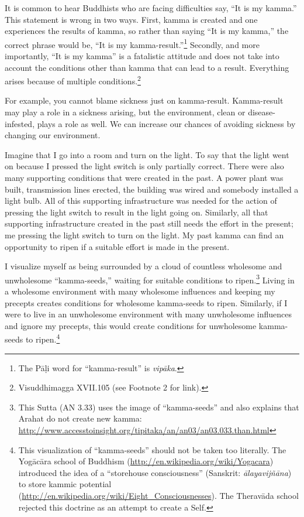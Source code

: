 It is common to hear Buddhists who are facing difficulties say, “It is my kamma.” This statement is wrong in two ways. First, kamma is created and one experiences the results of kamma, so rather than saying “It is my kamma,” the correct phrase would be, “It is my kamma-result.”\footnote{The Pāḷi word for “kamma-result” is \textit{vipāka}.} Secondly, and more importantly, “It is my kamma” is a fatalistic attitude and does not take into account the conditions other than kamma that can lead to a result. Everything arises because of multiple conditions.\footnote{Visuddhimagga XVII.105 (see Footnote 2 for link).} 

\pagebreak

For example, you cannot blame sickness just on kamma-result. Kamma-result may play a role in a sickness arising, but the environment, clean or disease-infested, plays a role as well. We can increase our chances of avoiding sickness by changing our environment.

Imagine that I go into a room and turn on the light. To say that the light went on because I pressed the light switch is only partially correct. There were also many supporting conditions that were created in the past. A power plant was built, transmission lines erected, the building was wired and somebody installed a light bulb. All of this supporting infrastructure was needed for the action of pressing the light switch to result in the light going on. Similarly, all that supporting infrastructure created in the past still needs the effort in the present; me pressing the light switch to turn on the light. My past kamma can find an opportunity to ripen if a suitable effort is made in the present.

I visualize myself as being surrounded by a cloud of countless wholesome and unwholesome “kamma-seeds,” waiting for suitable conditions to ripen.\footnote{This Sutta (AN 3.33) uses the image of “kamma-seeds” and also explains that Arahat do not create new kamma: \url{http://www.accesstoinsight.org/tipitaka/an/an03/an03.033.than.html}} Living in a wholesome environment with many wholesome influences and keeping my precepts creates conditions for wholesome kamma-seeds to ripen. Similarly, if I were to live in an unwholesome environment with many unwholesome influences and ignore my precepts, this would create conditions for unwholesome kamma-seeds to ripen.\footnote{This visualization of “kamma-seeds” should not be taken too literally. The Yogācāra school of Buddhism (\url{http://en.wikipedia.org/wiki/Yogacara}) introduced the idea of a “storehouse consciousness” (Sanskrit: \textit{ālayavijñāna}) to store kammic potential (\url{http://en.wikipedia.org/wiki/Eight_Consciousnesses}). The Theravāda school rejected this doctrine as an attempt to create a Self.}

